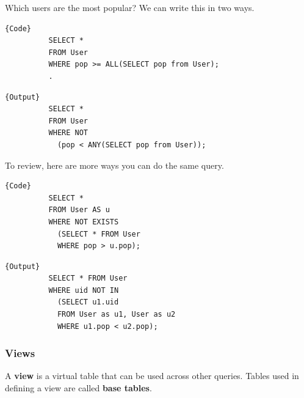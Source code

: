 \documentclass{article}
\begin{document}
      \begin{example}
        Which users are the most popular? We can write this in two ways. 

        \noindent\begin{minipage}{.5\textwidth}
        \begin{lstlisting}[]{Code}
          SELECT * 
          FROM User 
          WHERE pop >= ALL(SELECT pop from User); 
          .
        \end{lstlisting}
        \end{minipage}
        \hfill
        \begin{minipage}{.49\textwidth}
        \begin{lstlisting}[]{Output}
          SELECT * 
          FROM User 
          WHERE NOT 
            (pop < ANY(SELECT pop from User)); 
        \end{lstlisting}
        \end{minipage}

        To review, here are more ways you can do the same query. 

        \noindent\begin{minipage}{.5\textwidth}
        \begin{lstlisting}[]{Code}
          SELECT * 
          FROM User AS u 
          WHERE NOT EXISTS  
            (SELECT * FROM User
            WHERE pop > u.pop); 
        \end{lstlisting}
        \end{minipage}
        \hfill
        \begin{minipage}{.49\textwidth}
        \begin{lstlisting}[]{Output}
          SELECT * FROM User 
          WHERE uid NOT IN 
            (SELECT u1.uid
            FROM User as u1, User as u2 
            WHERE u1.pop < u2.pop); 
        \end{lstlisting}
        \end{minipage}
      \end{example}
    
    \subsubsection{Views}

      \begin{definition}[View]
        A \textbf{view} is a virtual table that can be used across other queries. Tables used in defining a view are called \textbf{base tables}. 
      \end{definition}
\end{document}
